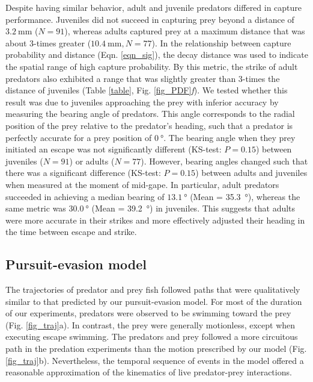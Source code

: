 \documentclass[]{rsos}%
\begin{document}
Despite having similar behavior, adult and juvenile predators differed in capture performance.
Juveniles did not succeed in capturing prey beyond a distance of $\SI{3.2}{\mm}$ ($N = 91$), whereas adults captured prey at a maximum distance that was about 3-times greater ($\SI{10.4}{\mm}, N = 77$).
In the relationship between capture probability and distance (Eqn. \ref{eqn_sig}), the decay distance was used to indicate the spatial range of high capture probability. 
By this metric, the strike of adult predators also exhibited a range that was slightly greater than 3-times the distance of juveniles (Table \ref{table}, Fig. \ref{fig_PDF}\textit{f}).
We tested whether this result was due to juveniles approaching the prey with inferior accuracy by measuring the bearing angle of predators.
This angle corresponds to the radial position of the prey relative to the predator's heading, such that a predator is perfectly accurate for a prey position of $\SI{0}{\degree}$.
The bearing angle when they prey initiated an escape was not significantly different (KS-test: $P = 0.15$) between juveniles ($N = 91$) or adults ($N = 77$).
However, bearing angles changed such that there was a significant difference (KS-test: $P = 0.15$) between adults and juveniles when measured at the moment of mid-gape.
In particular, adult predators succeeded in achieving a median bearing of $\SI{13.1}{\degree}$ (Mean = \SI{35.3}{\degree}), whereas the same metric was $\SI{30.0}{\degree}$ (Mean = \SI{39.2}{\degree}) in juveniles.
This suggests that adults were more accurate in their strikes and more effectively adjusted their heading in the time between escape and strike.


\subsection{Pursuit-evasion model} %
The trajectories of predator and prey fish followed paths that were qualitatively similar to that predicted by our pursuit-evasion model.
For most of the duration of our experiments, predators were observed to be swimming toward the prey (Fig. \ref{fig_traj}a). 
In contrast, the prey were generally motionless, except  when executing escape swimming.
The predators and prey followed a more circuitous path in the predation experiments than the motion prescribed by our model (Fig. \ref{fig_traj}b).
Nevertheless, the temporal sequence of events in the model offered a reasonable approximation of the kinematics of live predator-prey interactions.
\end{document}
